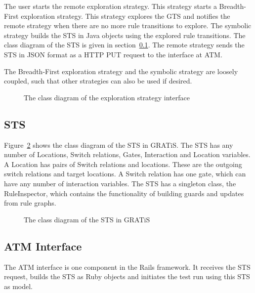 The user starts the remote exploration strategy. This strategy starts a Breadth-First exploration strategy. This strategy explores the GTS and notifies the remote strategy when there are no more rule transitions to explore. The symbolic strategy builds the STS in Java objects using the explored rule transitions. The class diagram  of the STS is given in section~\ref{sec:sts-setup}. The remote strategy sends the STS in JSON format as a HTTP PUT request to the interface at ATM.

The Breadth-First exploration strategy and the symbolic strategy are loosely coupled, such that other strategies can also be used if desired.
 
\begin{figure}[ht]
  \begin{center}
  \end{center}
  \caption{The class diagram of the exploration strategy interface}
  \label{fig:esi-diagram}
\end{figure}

\subsection{STS}\label{sec:sts-setup}
Figure~\ref{fig:sts-diagram} shows the class diagram of the STS in GRATiS. The STS has any number of Locations, Switch relations, Gates, Interaction and Location variables. A Location has pairs of Switch relations and locations. These are the outgoing switch relations and target locations. A Switch relation has one gate, which can have any number of interaction variables. The STS has a singleton class, the RuleInspector, which contains the functionality of building guards and updates from rule graphs.

\begin{figure}[ht]
  \begin{center}
  \end{center}
  \caption{The class diagram of the STS in GRATiS}
  \label{fig:sts-diagram}
\end{figure}

\subsection{ATM Interface}
The ATM interface is one component in the Rails framework. It receives the STS request, builds the STS as Ruby objects and initiates the test run using this STS as model.

